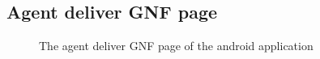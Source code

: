 \documentclass[11pt, a4paper]{article}
\begin{document}
\begin{appendices}
\subsection{Agent deliver GNF page} %
\begin{figure}[ht]
\centering
{}
\caption{The agent deliver GNF page of the android application}
\end{figure}
\clearpage


\end{appendices}
\end{document}
